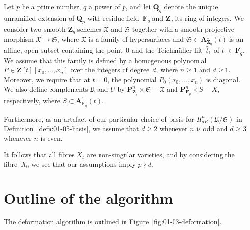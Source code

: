 \begin{notation} \label{not:01-03-main}
Let $p$ be a prime number, $q$ a power of $p$, and let $\mathbf{Q}_q$ 
denote the unique unramified extension of $\mathbf{Q}_p$ with residue 
field~$\mathbf{F}_q$ and $\mathbf{Z}_q$ its ring of integers.  
We consider two smooth $\mathbf{Z}_q$-schemes $\mathfrak{X}$ and $\mathfrak{S}$ 
together with a smooth projective morphism $\mathfrak{X} \to \mathfrak{S}$, 
where $\mathfrak{X}$ is a family of hypersurfaces 
and $\mathfrak{S} \subset \mathbf{A}_{\mathbf{Z}_q}^1(t)$ is an affine, open 
subset containing the point~$0$ and the Teichm\"uller lift~$\hat{t}_1$ of 
$t_1 \in \mathbf{F}_q$.  
We assume that this family is defined by a homogenous polynomial 
$P \in \mathbf{Z}[t][x_0,\dotsc,x_n]$ over the integers of degree~$d$, 
where $n \geq 1$ and $d \geq 1$.  
Moreover, we require that at $t = 0$, the polynomial $P_0(x_0,\dotsc,x_n)$ 
is diagonal.  
We also define complements $\mathfrak{U}$ and $U$ by 
$\mathbf{P}_{\mathbf{Z}_q}^n \times \mathfrak{S} - \mathfrak{X}$ 
and $\mathbf{P}_{\mathbf{F}_p}^n \times S - X$, respectively, 
where $S \subset \mathbf{A}_{\mathbf{F}_q}^1(t)$.  
\end{notation}

\begin{notation}
Furthermore, as an artefact of our particular choice of basis for 
$H_{dR}^n(\mathfrak{U}/\mathfrak{S})$ in Definition~\ref{defn:01-05-basis}, 
we assume that $d \geq 2$ whenever $n$ is odd and $d \geq 3$ whenever $n$ 
is even.
\end{notation}

\begin{rem}
It follows that all fibres $X_t$ are non-singular varieties, and by 
considering the fibre~$X_0$ we see that our assumptions imply $p \nmid d$.
\end{rem}


\section{Outline of the algorithm}

The deformation algorithm is outlined in Figure~\ref{fig:01-03-deformation}.

